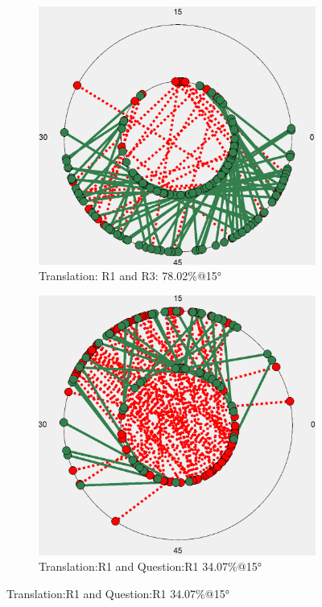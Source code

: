 \documentclass[a4paper]{article}
\begin{document}
\begin{figure}
    \centering
    \begin{subfigure}[b]{0.45\textwidth}
        \includegraphics[width=\linewidth]{stable_OF_run_only.png}
        \caption{Translation: R1 and R3: 78.02\%@15°}
        \label{fig:stable_OF_run_only}
    \end{subfigure}
    \hspace{0.03\textwidth} %
    \begin{subfigure}[b]{0.45\textwidth}
        \includegraphics[width=\linewidth]{stable_OF_run_ques.png}
        \caption{Translation:R1 and Question:R1 34.07\%@15°}
        \label{fig:stable_OF_run_ques}
    \end{subfigure}
    

\end{figure}
\end{document}
